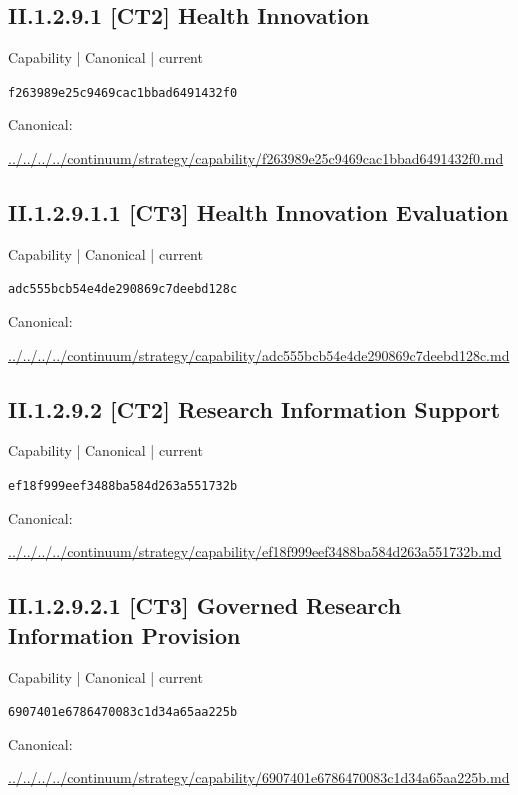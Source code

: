 \documentclass[10pt,a4paper]{article}
\begin{document}
\subsection*{II.1.2.9.1 [CT2] Health Innovation}
\label{element-f263989e25c9469cac1bbad6491432f0}
{\small Capability | Canonical | current}\par
\texttt{f263989e25c9469cac1bbad6491432f0}\par
Canonical: \par
{\footnotesize\url{../../../../continuum/strategy/capability/f263989e25c9469cac1bbad6491432f0.md}}\par
\subsection*{II.1.2.9.1.1 [CT3] Health Innovation Evaluation}
\label{element-adc555bcb54e4de290869c7deebd128c}
{\small Capability | Canonical | current}\par
\texttt{adc555bcb54e4de290869c7deebd128c}\par
Canonical: \par
{\footnotesize\url{../../../../continuum/strategy/capability/adc555bcb54e4de290869c7deebd128c.md}}\par
\subsection*{II.1.2.9.2 [CT2] Research Information Support}
\label{element-ef18f999eef3488ba584d263a551732b}
{\small Capability | Canonical | current}\par
\texttt{ef18f999eef3488ba584d263a551732b}\par
Canonical: \par
{\footnotesize\url{../../../../continuum/strategy/capability/ef18f999eef3488ba584d263a551732b.md}}\par
\subsection*{II.1.2.9.2.1 [CT3] Governed Research Information Provision}
\label{element-6907401e6786470083c1d34a65aa225b}
{\small Capability | Canonical | current}\par
\texttt{6907401e6786470083c1d34a65aa225b}\par
Canonical: \par
{\footnotesize\url{../../../../continuum/strategy/capability/6907401e6786470083c1d34a65aa225b.md}}\par
\end{document}
